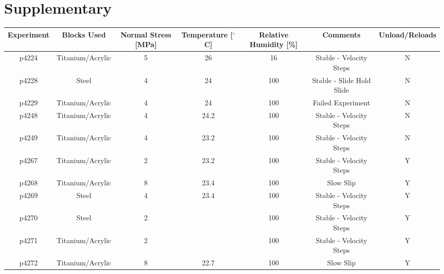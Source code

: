 \documentclass[11pt]{article}
\begin{document}
\newpage
\section{Supplementary}

\small
\begin{center}
\begin{sidewaystable}
    \begin{tabular}{ | c c c c c c c | }
\hline
Experiment & Blocks Used & Normal Stress [MPa] & Temperature [$^\circ$C] & Relative Humidity [\%] & Comments & Unload/Reloads \\
\hline
p4224      & Titanium/Acrylic & 5                   & 26              & 16                    & Stable - Velocity Steps         & N              \\
p4228      & Steel            & 4                   & 24              & 100                   & Stable - Slide Hold Slide       & N              \\
p4229      & Titanium/Acrylic & 4                   & 24              & 100                   & Failed Experiment               & N              \\
p4248      & Titanium/Acrylic & 4                   & 24.2            & 100                   & Stable - Velocity Steps         & N              \\
p4249      & Titanium/Acrylic & 4                   & 23.2            & 100                   & Stable - Velocity Steps         & N              \\
p4267      & Titanium/Acrylic & 2                   & 23.2            & 100                   & Stable - Velocity Steps         & Y              \\
p4268      & Titanium/Acrylic & 8                   & 23.4            & 100                   & Slow Slip                       & Y              \\
p4269      & Steel            & 4                   & 23.4            & 100                   & Stable - Velocity Steps         & Y              \\
p4270      & Steel            & 2                   &                 & 100                   & Stable - Velocity Steps         & Y              \\
p4271      & Titanium/Acrylic & 2                   &                 & 100                   & Stable - Velocity Steps         & Y              \\
p4272      & Titanium/Acrylic & 8                   & 22.7            & 100                   & Slow Slip                       & Y              \\

\end{tabular}
\end{sidewaystable}
\end{center}
\end{document}
